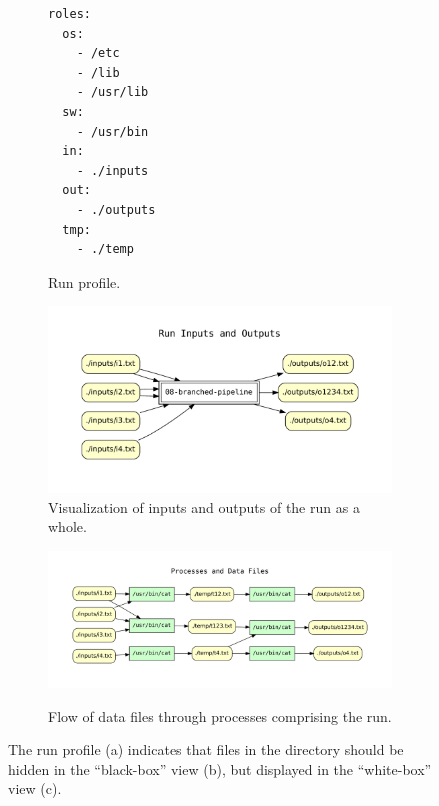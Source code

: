 \begin{figure}[th]
        \centering         
\begin{subfigure}[c]{0.18\linewidth}
\begin{verbatim}
roles:
  os:
    - /etc
    - /lib
    - /usr/lib
  sw:
    - /usr/bin
  in:
    - ./inputs
  out:
    - ./outputs
  tmp:
    - ./temp
\end{verbatim}
  \vspace*{-1em}
            \caption{Run profile.}
        \end{subfigure}
\hfill
        \begin{subfigure}[c]{0.69\linewidth}
          \centering
            \includegraphics[width=0.92\linewidth]{cpr_run_inputs_outputs.pdf}
            \caption{Visualization of inputs and outputs of the run as a whole.}
            \label{subfig-blackbox}
        \end{subfigure} 

\medskip

\centering 
\begin{subfigure}[b]{0.9\linewidth}
        {\includegraphics[width=1.0\linewidth]{cpr_processes_and_data_files.pdf}}
        \caption{Flow of data files through processes comprising the run.}
        \label{subfig-whitebox}
    \end{subfigure}
\caption{The run profile (a) indicates that files in the  directory should be hidden in the ``black-box'' view (b), but displayed in the ``white-box'' view (c).}
\label{fig-cpr-example}
  \vspace*{-1.5em}
\end{figure}





